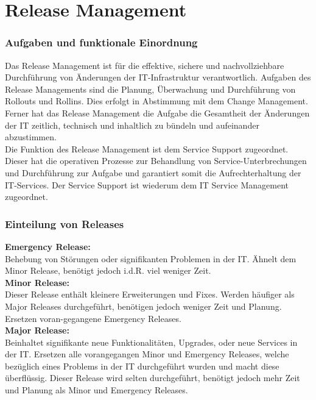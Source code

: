 \chapter{Release Management}
\subsection{Aufgaben und funktionale Einordnung}
Das Release Management ist für die effektive, sichere und nachvollziehbare Durchführung von Änderungen der IT-Infrastruktur verantwortlich. Aufgaben des Release Managements sind die Planung, Überwachung und Durchführung von Rollouts und Rollins. Dies erfolgt in Abstimmung mit dem Change Management.  Ferner hat das Release Management die Aufgabe die Gesamtheit der Änderungen der IT zeitlich, technisch und inhaltlich zu bündeln und aufeinander abzustimmen.
\\
Die Funktion des Release Management ist dem Service Support zugeordnet. Dieser hat die operativen Prozesse zur Behandlung von Service-Unterbrechungen und Durchführung zur Aufgabe und garantiert somit die Aufrechterhaltung der IT-Services. Der Service Support ist wiederum dem IT Service Management zugeordnet.  

\subsection{Einteilung von Releases}
\textbf{Emergency Release:}
\\
Behebung von Störungen oder signifikanten Problemen in der IT. Ähnelt dem Minor Release, benötigt jedoch \acs{i.d.R.} viel weniger Zeit.
\\
\textbf{Minor Release:}
\\
Dieser Release enthält kleinere Erweiterungen und Fixes. Werden häufiger als Major Releases durchgeführt, benötigen jedoch weniger Zeit und Planung. Ersetzen voran-gegangene Emergency Releases. 
\\
\textbf{Major Release:}
\\
Beinhaltet signifikante neue Funktionalitäten, Upgrades, oder neue Services in der IT. Ersetzen alle vorangegangen Minor und Emergency Releases, welche bezüglich eines Problems in der IT durchgeführt wurden und macht diese überflüssig. Dieser Release wird selten durchgeführt, benötigt jedoch mehr Zeit und Planung als Minor und Emergency Releases.

